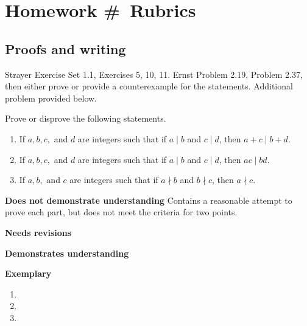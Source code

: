 \documentclass[letterpaper, 11pt]{ximera}
\begin{document}
\chapter{Homework \#\homework\ Rubrics}

\section*{Proofs and writing}  %
Strayer Exercise Set 1.1, Exercises 5, 10, 11. Ernst Problem 2.19, Problem 2.37, then either prove or provide a counterexample for the statements. Additional problem provided below.

\begin{ex}
 Prove or disprove the following statements.
	\begin{enumerate}[label=(\alph*)] %
		\item If $a,b,c,$ and $d$ are integers such that if $a\mid b$ and $c\mid d$, then $a+c\mid b+d$.
		\item If $a,b,c,$ and $d$ are integers such that if $a\mid b$ and $c\mid d$, then $ac\mid bd$.
		\item If $a,b,$ and $c$ are integers such that if $a\nmid b$ and $b\nmid c$, then $a\nmid c$.
	\end{enumerate}
\end{ex}

\begin{writeRubric}
    \item \textbf{Does not demonstrate understanding}
     Contains a reasonable attempt to prove each part, but does not meet the criteria for two points.
    \item \textbf{Needs revisions}
     
    \item \textbf{Demonstrates understanding}
    
    \item \textbf{Exemplary}
        
\end{writeRubric}
                                       
\begin{solution}
 	\begin{enumerate}[label=(\alph*)] %
		\item %
		\item %
		\item %
	\end{enumerate}
\end{solution}
\end{document}
